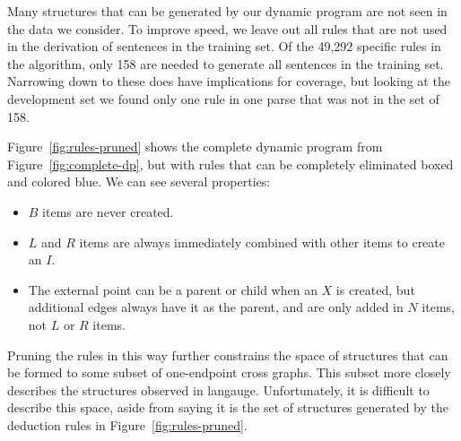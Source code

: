 Many structures that can be generated by our dynamic program are not seen in the data we consider.
To improve speed, we leave out all rules that are not used in the derivation of sentences in the training set.
Of the 49,292 specific rules in the algorithm, only 158 are needed to generate all sentences in the training set.
Narrowing down to these does have implications for coverage, but looking at the development set we found only one rule in one parse that was not in the set of 158.

Figure~\ref{fig:rules-pruned} shows the complete dynamic program from Figure~\ref{fig:complete-dp}, but with rules that can be completely eliminated boxed and colored blue.
We can see several properties:

\begin{itemize}
  \item $B$ items are never created.
  \item $L$ and $R$ items are always immediately combined with other items to create an $I$.
  \item The external point can be a parent or child when an $X$ is created, but additional edges always have it as the parent, and are only added in $N$ items, not $L$ or $R$ items.
\end{itemize}

Pruning the rules in this way further constrains the space of structures that can be formed to some subset of one-endpoint cross graphs.
This subset more closely describes the structures observed in langauge.
Unfortunately, it is difficult to describe this space, aside from saying it is the set of structures generated by the deduction rules in Figure~\ref{fig:rules-pruned}.





